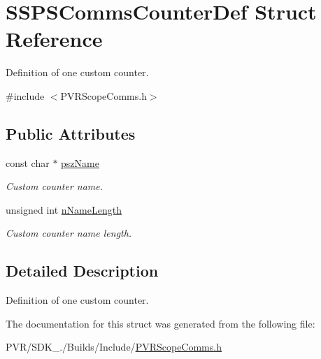 \hypertarget{struct_s_s_p_s_comms_counter_def}{\section{S\+S\+P\+S\+Comms\+Counter\+Def Struct Reference}
\label{struct_s_s_p_s_comms_counter_def}
}


Definition of one custom counter.  




{\ttfamily \#include $<$P\+V\+R\+Scope\+Comms.\+h$>$}

\subsection*{Public Attributes}
\begin{DoxyCompactItemize}
\item 
\hypertarget{struct_s_s_p_s_comms_counter_def_a4339b07d48192c86c7749f88dbca74b5}{const char $\ast$ \hyperlink{struct_s_s_p_s_comms_counter_def_a4339b07d48192c86c7749f88dbca74b5}{psz\+Name}}\label{struct_s_s_p_s_comms_counter_def_a4339b07d48192c86c7749f88dbca74b5}

\begin{DoxyCompactList}\small\item\em Custom counter name. \end{DoxyCompactList}\item 
\hypertarget{struct_s_s_p_s_comms_counter_def_a6b0255a812c9f03c90111ccc108f9fc5}{unsigned int \hyperlink{struct_s_s_p_s_comms_counter_def_a6b0255a812c9f03c90111ccc108f9fc5}{n\+Name\+Length}}\label{struct_s_s_p_s_comms_counter_def_a6b0255a812c9f03c90111ccc108f9fc5}

\begin{DoxyCompactList}\small\item\em Custom counter name length. \end{DoxyCompactList}\end{DoxyCompactItemize}


\subsection{Detailed Description}
Definition of one custom counter. 



 

The documentation for this struct was generated from the following file\+:\begin{DoxyCompactItemize}
\item 
P\+V\+R/\+S\+D\+K\+\_./\+Builds/\+Include/\hyperlink{_p_v_r_scope_comms_8h}{P\+V\+R\+Scope\+Comms.\+h}\end{DoxyCompactItemize}
